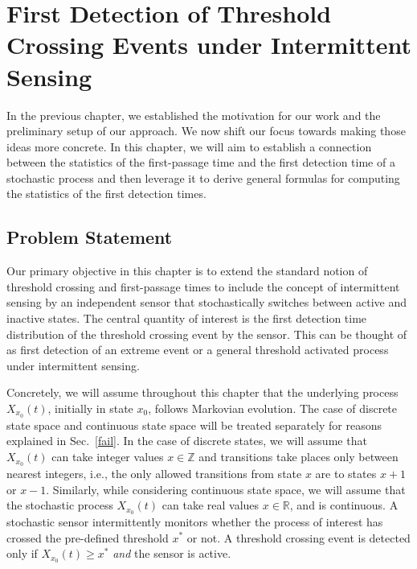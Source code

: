 
\chapter{First Detection of Threshold Crossing Events under Intermittent Sensing}
\label{chap2}

In the previous chapter, we established the motivation for our work and the preliminary setup of our approach. We now shift our focus towards making those ideas more concrete. In this chapter, we will aim to establish a connection between the statistics of the first-passage time and the first detection time of a stochastic process and then leverage it to derive general formulas for computing the statistics of the first detection times. 

\section{Problem Statement}

Our primary objective in this chapter is to extend the standard notion of threshold crossing and first-passage times to include the concept of intermittent sensing by an independent sensor that stochastically switches between active and inactive states. The central quantity of interest is the first detection time distribution of the threshold crossing event by the sensor. This can be thought of as first detection of an extreme event \cite{kishore_extreme_2011,malik_rare_2020,kumar_extreme_2020} or a general threshold activated process \cite{greben1,bdapprox,dao_duc_threshold_2010,grebenkov_reversible_2022,grebenkov2022first} under intermittent sensing. 

Concretely, we will assume throughout this chapter that the underlying process $X_{x_0}(t)$, initially in state $x_0$, follows Markovian evolution. The case of discrete state space and continuous state space will be treated separately for reasons explained in Sec.~\ref{fail}. In the case of discrete states, we will assume that $X_{x_0}(t)$ can take integer values $x \in \mathbb{Z}$ and transitions take places only between nearest integers, i.e., the only allowed transitions from state $x$ are to states $x+1$ or $x-1$. Similarly, while considering continuous state space, we will assume that the stochastic process $X_{x_0}(t)$ can take real values $x \in \mathbb{R}$, and is continuous. A stochastic sensor intermittently monitors whether the process of interest has crossed the pre-defined threshold $x^*$ or not. A threshold crossing event is detected only if $X_{x_0}(t) \geq x^*$ {\it and} the sensor is active. 

